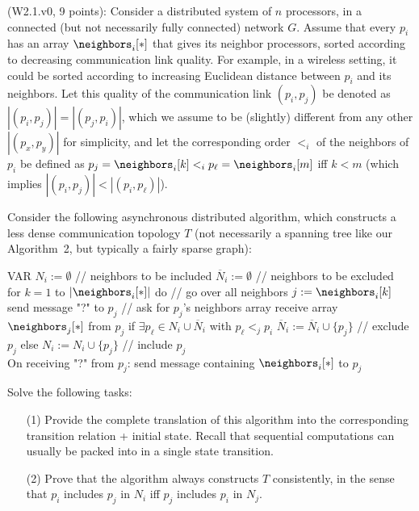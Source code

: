 \begin{Exc}{(W2.1.v0, 9 points):}
Consider a distributed system of $n$ processors, in a
connected (but not necessarily fully connected) network $G$.
Assume that every $p_i$ has
an array $\neighbors_i[*]$ that gives its neighbor processors,
sorted according to decreasing communication link quality.
For example, in a wireless setting, it could be sorted according
to increasing Euclidean distance between $p_i$ and its neighbors.
Let this quality of the communication link $(p_i,p_j)$ be
denoted as $|(p_i,p_j)|=|(p_j,p_i)|$, which we assume to be (slightly)
different from any other $|(p_x,p_y)|$ for simplicity, and let
the corresponding order $<_i$
of the neighbors of $p_i$ be defined as
$p_j=\neighbors_i[k] <_i p_\ell=\neighbors_i[m]$ iff $k<m$ (which
implies $|(p_i,p_j)|<|(p_i,p_\ell)|$).

Consider the following asynchronous distributed algorithm, which constructs
a less dense communication topology $T$ (not necessarily a spanning
tree like our Algorithm~2, but typically a fairly sparse graph):

\begin{code}%
\vspace*{-1cm}%
\NL
{}\NL
VAR $N_i := \emptyset$ // neighbors to be included\NL
\> $\overline{N}_i := \emptyset$ // neighbors to be excluded\\
\NL
for $k=1$ to $|\neighbors_i[*]|$ do // go over all neighbors\NL
\> $j := \neighbors_i[k]$\NL
\> send message "?" to $p_j$ // ask for $p_j$'s neighbors array\NL
\> receive array $\neighbors_j[*]$ from $p_j$\NL
\> if $\exists p_\ell \in N_i \cup \overline{N}_i$ with $p_\ell <_j p_i$\NL
\>\> $\overline{N}_i := \overline{N}_i \cup \{p_j\}$ // exclude $p_j$\NL
\> else\NL
\>\> $N_i := N_i \cup \{p_j\}$ // include $p_j$\\
\NL
On receiving "?" from $p_j$:\NL
\> send message containing $\neighbors_i[*]$ to $p_j$
\end{code}

Solve the following tasks:
\begin{enumerate}
\item[(1)] Provide the complete translation of this algorithm into the corresponding
transition relation + initial state. Recall that sequential computations can
usually be packed into in a single state transition.

\item[(2)] Prove that the algorithm always constructs $T$ consistently, in
the sense that $p_i$ includes $p_j$ in $N_i$ iff $p_j$ includes $p_i$
in $N_j$.


\end{enumerate}
\end{Exc}
